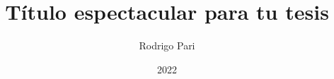\makeatletter
\title{Título espectacular para tu tesis}\let\Title\@title
\author{Rodrigo Pari}        \let\Author\@author
\date{2022}                         \let\Date\@date

\newcommand{\@universidad}{}
\newcommand{\universidad}[1]{\renewcommand{\@universidad}{#1}}

\newcommand{\@facultad}{}
\newcommand{\facultad}[1]{\renewcommand{\@facultad}{#1}}

\newcommand{\@carrera}{}
\newcommand{\carrera}[1]{\renewcommand{\@carrera}{#1}}

\newcommand{\@tutor}{}
\newcommand{\tutor}[1]{\renewcommand{\@tutor}{#1}}

\newcommand{\@departamento}{}
\newcommand{\departamento}[1]{\renewcommand{\@departamento}{#1}}

\newcommand{\@pais}{}
\newcommand{\pais}[1]{\renewcommand{\@pais}{#1}}


\universidad{UNIVERSIDAD MAYOR DE SAN ANDRÉS}\let\Universidad\@universidad
\facultad{FACULTAD DE CIENCIAS PURAS Y NATURALES}\let\Facultad\@facultad
\carrera{CARRERA DE MATEMÁTICAS}\let\Carrera\@carrera
\tutor{Dr. Latex}\let\Tutor\@tutor
\departamento{La Paz}\let\Departamento\@departamento
\pais{Bolivia}\let\Pais\@pais

\makeatother
